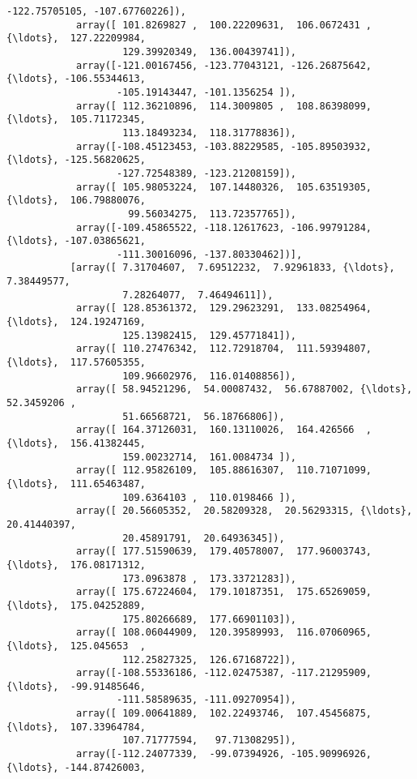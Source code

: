 \documentclass[11pt]{article}
\begin{document}
\begin{Verbatim}[commandchars=\\\{\}]
                   -122.75705105, -107.67760226]),
            array([ 101.8269827 ,  100.22209631,  106.0672431 , {\ldots},  127.22209984,
                    129.39920349,  136.00439741]),
            array([-121.00167456, -123.77043121, -126.26875642, {\ldots}, -106.55344613,
                   -105.19143447, -101.1356254 ]),
            array([ 112.36210896,  114.3009805 ,  108.86398099, {\ldots},  105.71172345,
                    113.18493234,  118.31778836]),
            array([-108.45123453, -103.88229585, -105.89503932, {\ldots}, -125.56820625,
                   -127.72548389, -123.21208159]),
            array([ 105.98053224,  107.14480326,  105.63519305, {\ldots},  106.79880076,
                     99.56034275,  113.72357765]),
            array([-109.45865522, -118.12617623, -106.99791284, {\ldots}, -107.03865621,
                   -111.30016096, -137.80330462])],
           [array([ 7.31704607,  7.69512232,  7.92961833, {\ldots},  7.38449577,
                    7.28264077,  7.46494611]),
            array([ 128.85361372,  129.29623291,  133.08254964, {\ldots},  124.19247169,
                    125.13982415,  129.45771841]),
            array([ 110.27476342,  112.72918704,  111.59394807, {\ldots},  117.57605355,
                    109.96602976,  116.01408856]),
            array([ 58.94521296,  54.00087432,  56.67887002, {\ldots},  52.3459206 ,
                    51.66568721,  56.18766806]),
            array([ 164.37126031,  160.13110026,  164.426566  , {\ldots},  156.41382445,
                    159.00232714,  161.0084734 ]),
            array([ 112.95826109,  105.88616307,  110.71071099, {\ldots},  111.65463487,
                    109.6364103 ,  110.0198466 ]),
            array([ 20.56605352,  20.58209328,  20.56293315, {\ldots},  20.41440397,
                    20.45891791,  20.64936345]),
            array([ 177.51590639,  179.40578007,  177.96003743, {\ldots},  176.08171312,
                    173.0963878 ,  173.33721283]),
            array([ 175.67224604,  179.10187351,  175.65269059, {\ldots},  175.04252889,
                    175.80266689,  177.66901103]),
            array([ 108.06044909,  120.39589993,  116.07060965, {\ldots},  125.045653  ,
                    112.25827325,  126.67168722]),
            array([-108.55336186, -112.02475387, -117.21295909, {\ldots},  -99.91485646,
                   -111.58589635, -111.09270954]),
            array([ 109.00641889,  102.22493746,  107.45456875, {\ldots},  107.33964784,
                    107.71777594,   97.71308295]),
            array([-112.24077339,  -99.07394926, -105.90996926, {\ldots}, -144.87426003,

\end{Verbatim}
\end{document}
